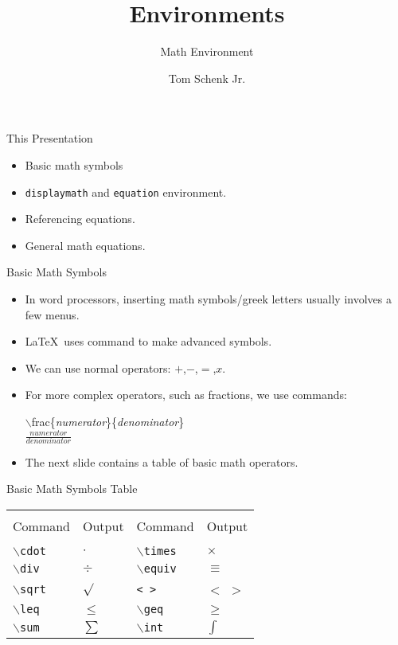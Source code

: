 \documentclass[pdf]{prosper}
\title{Environments}
\subtitle{Math Environment}
\author{Tom Schenk Jr.}
\begin{document}
\maketitle
\begin{slide}{This Presentation}
	\begin{itemize}
		\item Basic math symbols
		\item \texttt{displaymath} and \texttt{equation} environment.
		\item Referencing equations.
		\item General math equations.
	\end{itemize}
\end{slide}
\begin{slide}{Basic Math Symbols}
	\begin{itemize}
		\item In word processors, inserting math symbols/greek letters usually involves a few menus.
		\item \LaTeX\ uses command to make advanced symbols.
		\item We can use normal operators: $+$,$-$,$=$,$x$.
		\item For more complex operators, such as fractions, we use commands:
			\begin{center}
				$\backslash$frac\{\textit{numerator}\}\{\textit{denominator}\} \\
				$\frac{\textit{numerator}}{\textit{denominator}}$
			\end{center}
		\item The next slide contains a table of basic math operators.
	\end{itemize}
\end{slide}
\begin{slide}{Basic Math Symbols Table}
	\begin{center}
		\begin{tabular}{l l l l}
			\hline \\
			Command & Output & Command & Output\\
			\hline \\
			\texttt{$\backslash$cdot} & $\cdot$ & \texttt{$\backslash$times} & $\times$ \\
			\texttt{$\backslash$div} & $\div$ & \texttt{$\backslash$equiv} & $\equiv$ \\ 
			\texttt{$\backslash$sqrt} & $\sqrt{}$ & \texttt{< >} & $<$ $>$ \\
			\texttt{$\backslash$leq} & $\leq$ & \texttt{$\backslash$geq} & $\geq$ \\
			\texttt{$\backslash$sum} & $\sum$ & \texttt{$\backslash$int} & $\int$ \\
		\end{tabular}
	\end{center}
\end{slide}
\end{document}
